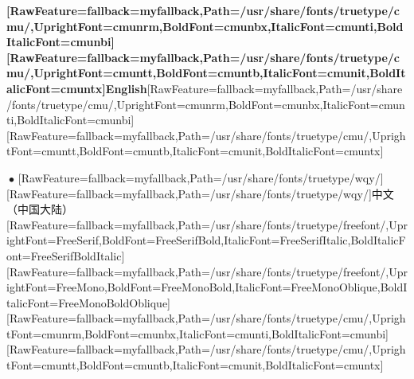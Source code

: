 \documentclass[fontsize=11pt,paper=A4,BCOR=12mm,DIV=13,open=any,listof=totoc,toc=flat]{scrbook}
\begin{document}
\allowdisplaybreaks
\raggedbottom
\thispagestyle{empty}
\pagestyle{empty}
%

{}
\maketitle
\pagestyle{scrheadings}

\setcounter{tocdepth}{\mytocdepth}
\tableofcontents 

{}

%

\label{0}{\bfseries \allowbreak{}\setmainfont{cmunbx.ttf}[RawFeature={fallback=myfallback},Path=/usr/share/fonts/truetype/cmu/,UprightFont=cmunrm,BoldFont=cmunbx,ItalicFont=cmunti,BoldItalicFont=cmunbi]\setmonofont{cmunbx.ttf}[RawFeature={fallback=myfallback},Path=/usr/share/fonts/truetype/cmu/,UprightFont=cmuntt,BoldFont=cmuntb,ItalicFont=cmunit,BoldItalicFont=cmuntx]\bfseries English}\allowbreak{}\setmainfont{cmunrm.ttf}[RawFeature={fallback=myfallback},Path=/usr/share/fonts/truetype/cmu/,UprightFont=cmunrm,BoldFont=cmunbx,ItalicFont=cmunti,BoldItalicFont=cmunbi]\setmonofont{cmunrm.ttf}[RawFeature={fallback=myfallback},Path=/usr/share/fonts/truetype/cmu/,UprightFont=cmuntt,BoldFont=cmuntb,ItalicFont=cmunit,BoldItalicFont=cmuntx]







{\mbox{$~$}}{\mbox{$\bullet$}} \allowbreak{}\setmainfont{wqy-zenhei.ttc}[RawFeature={fallback=myfallback},Path=/usr/share/fonts/truetype/wqy/]\setmonofont{wqy-zenhei.ttc}[RawFeature={fallback=myfallback},Path=/usr/share/fonts/truetype/wqy/]中文（中国大陆）\allowbreak{}\setmainfont{FreeSerif.ttf}[RawFeature={fallback=myfallback},Path=/usr/share/fonts/truetype/freefont/,UprightFont=FreeSerif,BoldFont=FreeSerifBold,ItalicFont=FreeSerifItalic,BoldItalicFont=FreeSerifBoldItalic]\setmonofont{FreeSerif.ttf}[RawFeature={fallback=myfallback},Path=/usr/share/fonts/truetype/freefont/,UprightFont=FreeMono,BoldFont=FreeMonoBold,ItalicFont=FreeMonoOblique,BoldItalicFont=FreeMonoBoldOblique]‎\footnotemark[1]\allowbreak{}\setmainfont{cmunrm.ttf}[RawFeature={fallback=myfallback},Path=/usr/share/fonts/truetype/cmu/,UprightFont=cmunrm,BoldFont=cmunbx,ItalicFont=cmunti,BoldItalicFont=cmunbi]\setmonofont{cmunrm.ttf}[RawFeature={fallback=myfallback},Path=/usr/share/fonts/truetype/cmu/,UprightFont=cmuntt,BoldFont=cmuntb,ItalicFont=cmunit,BoldItalicFont=cmuntx]





\pagebreak
\end{document}
